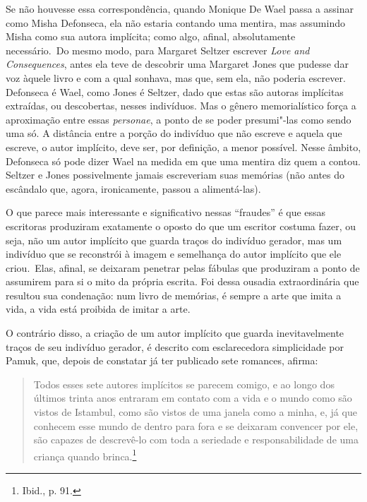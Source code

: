 Se não houvesse essa correspondência, quando Monique De Wael passa a
assinar como Misha Defonseca, ela não estaria contando uma mentira, mas
assumindo Misha como sua autora implícita; como algo, afinal,
absolutamente necessário.~Do mesmo modo, para Margaret Seltzer escrever
\emph{Love and Consequences}, antes ela teve de descobrir uma Margaret
Jones que pudesse dar voz àquele livro e com a qual sonhava, mas que,
sem ela, não poderia escrever. Defonseca é Wael, como Jones é Seltzer, dado que estas são autoras implícitas extraídas, ou descobertas, nesses
indivíduos. Mas o gênero memorialístico força a aproximação entre essas
\emph{personae}, a ponto de se poder presumi"-las como sendo uma só. A
distância entre a porção do indivíduo que não escreve e aquela que
escreve, o autor implícito, deve ser, por definição, a menor possível.
Nesse âmbito, Defonseca só pode dizer Wael na medida em que uma mentira
diz quem a contou. Seltzer e Jones possivelmente jamais escreveriam suas
memórias (não antes do escândalo que, agora, ironicamente, passou a
alimentá-las).

O que parece mais interessante e significativo nessas ``fraudes'' é que
essas escritoras produziram exatamente o oposto do que um escritor
costuma fazer, ou seja, não um autor implícito que guarda traços do
indivíduo gerador, mas um indivíduo que se reconstrói à imagem e
semelhança do autor implícito que ele criou.~Elas, afinal, se deixaram
penetrar pelas fábulas que produziram a ponto de assumirem para si o
mito da própria escrita. Foi dessa ousadia extraordinária que resultou
sua condenação: num livro de memórias, é sempre a arte que imita a vida,
a vida está proibida de imitar a arte.

O contrário disso, a criação de um autor implícito que guarda
inevitavelmente traços de seu indivíduo gerador, é descrito com
esclarecedora simplicidade por Pamuk, que, depois de constatar já ter
publicado sete romances, afirma:

\begin{quote}
Todos esses sete autores implícitos se parecem comigo, e ao longo dos
últimos trinta anos entraram em contato com a vida e o mundo como são
vistos de Istambul, como são vistos de uma janela como a minha, e, já
que conhecem esse mundo de dentro para fora e se deixaram convencer por
ele, são capazes de descrevê-lo com toda a seriedade e responsabilidade
de uma criança quando brinca.\footnote{Ibid., p. 91.}
\end{quote}

